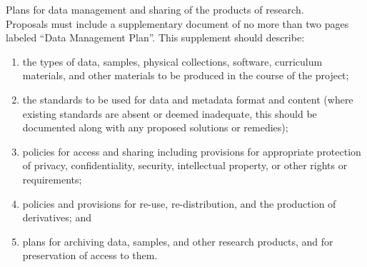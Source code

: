 











%
Plans for data management and sharing of the products of research.\\ 

Proposals must include a supplementary document of no more than
two pages labeled ``Data Management Plan''. This supplement should
describe:

\begin{enumerate}
\item the types of data, samples, physical collections, software, curriculum materials, and other materials to be produced in the course of the project;

\item the standards to be used for data and metadata format and content (where existing standards are absent or deemed inadequate, this should be documented along with any proposed solutions or remedies);

\item policies for access and sharing including provisions for appropriate protection of privacy, confidentiality, security, intellectual property, or other rights or requirements;

\item policies and provisions for re-use, re-distribution, and the production of derivatives; and

\item plans for archiving data, samples, and other research products, and for preservation of access to them.

\end{enumerate}

%


